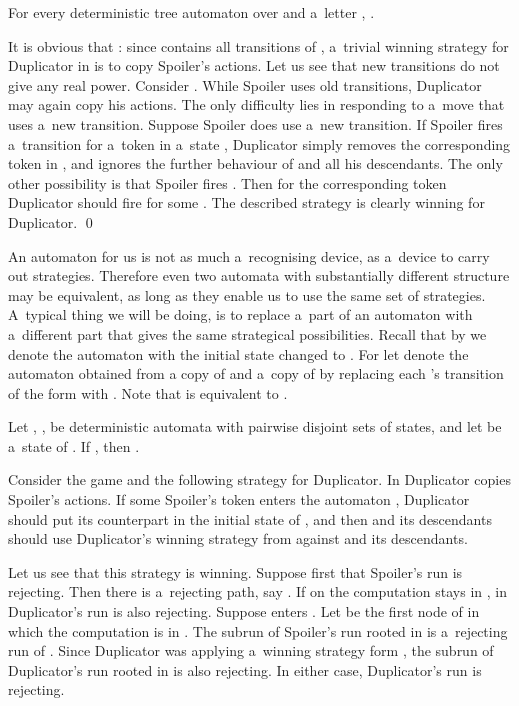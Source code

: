\documentclass{LMCS}
\begin{document}
\begin{lem} \label{extended}
For every deterministic tree automaton  over  and a~letter , .
\end{lem}

\proof It is obvious that : since  contains all transitions of , a~trivial winning strategy for Duplicator in  is to copy Spoiler's actions. Let us see that new transitions do not give any real power. Consider . While Spoiler uses old transitions, Duplicator may again copy his actions. The only difficulty lies in responding to a~move that uses a~new transition. Suppose Spoiler does use a~new transition. If Spoiler fires a~transition  for a~token  in a~state , Duplicator simply removes the corresponding token in , and ignores the further behaviour of  and all his descendants. The only other possibility is that Spoiler fires .  Then for the corresponding token Duplicator should fire  for some . The described strategy is clearly winning for Duplicator. \qed


\vspace{5pt}

An automaton for us is not as much a~recognising device, as a~device to carry out strategies. Therefore even two automata with substantially different structure may be equivalent, as long as they enable us to use the same set of strategies. A~typical thing we will be doing, is to replace a~part of an automaton with a~different part that gives the same strategical possibilities. Recall that by  we denote the automaton  with the initial state changed to . For  let  denote the automaton obtained from a copy of  and a~copy of  by replacing each 's transition of the form  with . Note that  is equivalent to . 

\begin{lem} \label{substitution} 
Let , ,  be deterministic automata with pairwise disjoint sets of states, and let  be a~state of . If , then . 
\end{lem}

\proof Consider the game  and the following strategy for Duplicator. In  Duplicator copies Spoiler's actions. If some Spoiler's token  enters the automaton , Duplicator should put its counterpart  in the initial state of , and then  and its descendants should use Duplicator's winning strategy from  against  and its descendants. 

Let us see that this strategy is winning. Suppose first that Spoiler's run is rejecting. Then there is a~rejecting path, say . If on  the computation stays in , in Duplicator's run  is also rejecting. Suppose  enters . Let  be the first node of  in which the computation is in . The subrun of Spoiler's run rooted in  is a~rejecting run of . Since Duplicator was applying a~winning strategy form , the subrun of Duplicator's run rooted in  is also rejecting. In either case, Duplicator's run is rejecting. 
\end{document}
